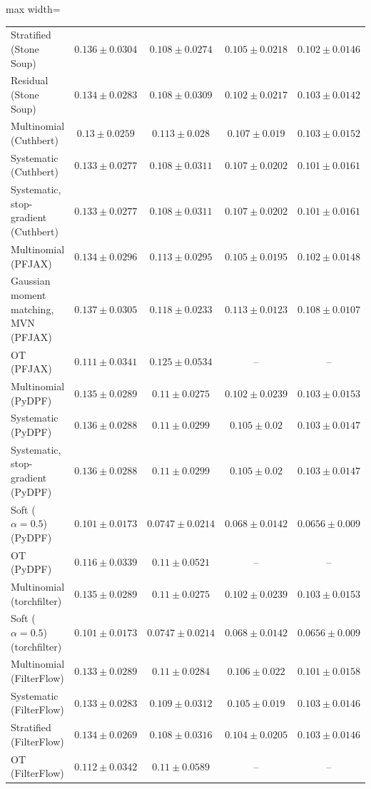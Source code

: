 \begin{table}[H]
\begin{adjustbox}{max width=\linewidth}
\begin{tabular}{lcccc}
Stratified (Stone Soup) & $0.136\pm0.0304$ & $0.108\pm0.0274$ & $0.105\pm0.0218$ & $0.102\pm0.0146$ \\
Residual (Stone Soup) & $0.134\pm0.0283$ & $0.108\pm0.0309$ & $0.102\pm0.0217$ & $0.103\pm0.0142$ \\
Multinomial (Cuthbert) & $0.13\pm0.0259$ & $0.113\pm0.028$ & $0.107\pm0.019$ & $0.103\pm0.0152$ \\
Systematic (Cuthbert) & $0.133\pm0.0277$ & $0.108\pm0.0311$ & $0.107\pm0.0202$ & $0.101\pm0.0161$ \\
Systematic, stop-gradient (Cuthbert) & $0.133\pm0.0277$ & $0.108\pm0.0311$ & $0.107\pm0.0202$ & $0.101\pm0.0161$ \\
Multinomial (PFJAX) & $0.134\pm0.0296$ & $0.113\pm0.0295$ & $0.105\pm0.0195$ & $0.102\pm0.0148$ \\
Gaussian moment matching, MVN (PFJAX) & $0.137\pm0.0305$ & $0.118\pm0.0233$ & $0.113\pm0.0123$ & $0.108\pm0.0107$ \\
OT (PFJAX) & $0.111\pm0.0341$ & $0.125\pm0.0534$ & -- & -- \\
Multinomial (PyDPF) & $0.135\pm0.0289$ & $0.11\pm0.0275$ & $0.102\pm0.0239$ & $0.103\pm0.0153$ \\
Systematic (PyDPF) & $0.136\pm0.0288$ & $0.11\pm0.0299$ & $0.105\pm0.02$ & $0.103\pm0.0147$ \\
Systematic, stop-gradient (PyDPF) & $0.136\pm0.0288$ & $0.11\pm0.0299$ & $0.105\pm0.02$ & $0.103\pm0.0147$ \\
Soft ($\alpha{=}0.5$) (PyDPF) & $0.101\pm0.0173$ & $0.0747\pm0.0214$ & $0.068\pm0.0142$ & $0.0656\pm0.009$ \\
OT (PyDPF) & $0.116\pm0.0339$ & $0.11\pm0.0521$ & -- & -- \\
Multinomial (torchfilter) & $0.135\pm0.0289$ & $0.11\pm0.0275$ & $0.102\pm0.0239$ & $0.103\pm0.0153$ \\
Soft ($\alpha{=}0.5$) (torchfilter) & $0.101\pm0.0173$ & $0.0747\pm0.0214$ & $0.068\pm0.0142$ & $0.0656\pm0.009$ \\
Multinomial (FilterFlow) & $0.133\pm0.0289$ & $0.11\pm0.0284$ & $0.106\pm0.022$ & $0.101\pm0.0158$ \\
Systematic (FilterFlow) & $0.133\pm0.0283$ & $0.109\pm0.0312$ & $0.105\pm0.019$ & $0.103\pm0.0146$ \\
Stratified (FilterFlow) & $0.134\pm0.0269$ & $0.108\pm0.0316$ & $0.104\pm0.0205$ & $0.103\pm0.0146$ \\
OT (FilterFlow) & $0.112\pm0.0342$ & $0.11\pm0.0589$ & -- & -- \\

\end{tabular}
\end{adjustbox}
\end{table}
